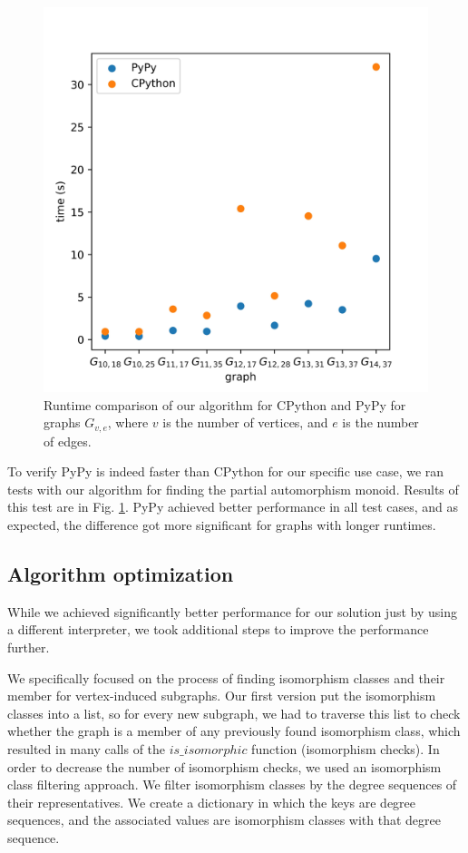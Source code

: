 \begin{figure}[H]
\begin{center}
\includegraphics[scale=0.8,keepaspectratio]{images/cpython_pypy_comparison.jpg}
\end{center}
\caption{Runtime comparison of our algorithm for CPython and PyPy for graphs $G_{v,e}$, where $v$ is the number of vertices, and $e$ is the number of edges.}
\label{fig:cpython_pypy_comparison}
\end{figure}

To verify PyPy is indeed faster than CPython for our specific use case, we ran tests with our algorithm for finding the partial automorphism monoid. Results of this test are in Fig. \ref{fig:cpython_pypy_comparison}. PyPy achieved better performance in all test cases, and as expected, the difference got more significant for graphs with longer runtimes.

\subsection{Algorithm optimization}

While we achieved significantly better performance for our solution just by using a different interpreter, we took additional steps to improve the performance further.

We specifically focused on the process of finding isomorphism classes and their member for vertex-induced subgraphs. Our first version put the isomorphism classes into a list, so for every new subgraph, we had to traverse this list to check whether the graph is a member of any previously found isomorphism class, which resulted in many calls of the $is\_isomorphic$ function (isomorphism checks). In order to decrease the number of isomorphism checks, we used an isomorphism class filtering approach. We filter isomorphism classes by the degree sequences of their representatives. We create a dictionary in which the keys are degree sequences, and the associated values are isomorphism classes with that degree sequence.

